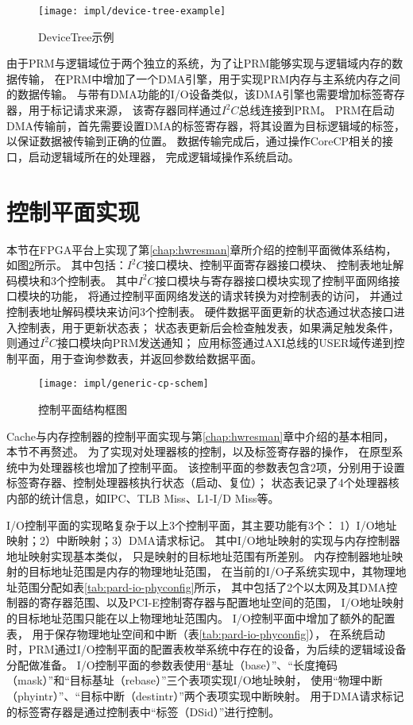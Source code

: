 \begin{figure}[htb]
  \centering
  \texttt{[image: impl/device-tree-example]}
  \caption{DeviceTree示例}
  \label{fig:device-tree-example}
\end{figure}

由于PRM与逻辑域位于两个独立的系统，为了让PRM能够实现与逻辑域内存的数据传输，
在PRM中增加了一个DMA引擎，用于实现PRM内存与主系统内存之间的数据传输。
与带有DMA功能的I/O设备类似，该DMA引擎也需要增加标签寄存器，用于标记请求来源，
该寄存器同样通过$I^2C$总线连接到PRM。
PRM在启动DMA传输前，首先需要设置DMA的标签寄存器，将其设置为目标逻辑域的标签，
以保证数据被传输到正确的位置。
数据传输完成后，通过操作CoreCP相关的接口，启动逻辑域所在的处理器，
完成逻辑域操作系统启动。


\section{控制平面实现}
\label{chap:impl:cp}

本节在FPGA平台上实现了第\ref{chap:hwresman}章所介绍的控制平面微体系结构，
如图\ref{fig:generic-cp-schem}所示。
其中包括：$I^2C$接口模块、控制平面寄存器接口模块、
控制表地址解码模块和3个控制表。
其中$I^2C$接口模块与寄存器接口模块实现了控制平面网络接口模块的功能，
将通过控制平面网络发送的请求转换为对控制表的访问，
并通过控制表地址解码模块来访问3个控制表。
硬件数据平面更新的状态通过状态接口进入控制表，用于更新状态表；
状态表更新后会检查触发表，如果满足触发条件，则通过$I^2C$接口模块向PRM发送通知；
应用标签通过AXI总线的USER域传递到控制平面，用于查询参数表，并返回参数给数据平面。

\begin{figure}[htb]
  \centering
  \texttt{[image: impl/generic-cp-schem]}
  \caption{控制平面结构框图}
  \label{fig:generic-cp-schem}
\end{figure}

Cache与内存控制器的控制平面实现与第\ref{chap:hwresman}章中介绍的基本相同，
本节不再赘述。
为了实现对处理器核的控制，以及标签寄存器的操作，
在原型系统中为处理器核也增加了控制平面。
该控制平面的参数表包含2项，分别用于设置标签寄存器、控制处理器核执行状态（启动、复位）；
状态表记录了4个处理器核内部的统计信息，如IPC、TLB Miss、L1-I/D Miss等。

I/O控制平面的实现略复杂于以上3个控制平面，其主要功能有3个：
1）I/O地址映射；2）中断映射；3）DMA请求标记。
其中I/O地址映射的实现与内存控制器地址映射实现基本类似，
只是映射的目标地址范围有所差别。
内存控制器地址映射的目标地址范围是内存的物理地址范围，
在当前的I/O子系统实现中，其物理地址范围分配如表\ref{tab:pard-io-phyconfig}所示，
其中包括了2个以太网及其DMA控制器的寄存器范围、以及PCI-E控制寄存器与配置地址空间的范围，
I/O地址映射的目标地址范围只能在以上物理地址范围内。
I/O控制平面中增加了额外的配置表，
用于保存物理地址空间和中断（表\ref{tab:pard-io-phyconfig}），
在系统启动时，PRM通过I/O控制平面的配置表枚举系统中存在的设备，为后续的逻辑域设备分配做准备。
I/O控制平面的参数表使用``基址（base）''、``长度掩码（mask）''和``目标基址（rebase）''三个表项实现I/O地址映射，
使用``物理中断（phyintr）''、``目标中断（destintr）''两个表项实现中断映射。
用于DMA请求标记的标签寄存器是通过控制表中``标签（DSid）''进行控制。

